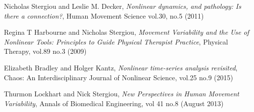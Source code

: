 \documentclass[10pt]{article}
\begin{document}
\begin{thebibliography}{10}
Nicholas Stergiou and Leslie M. Decker,
{\it Nonlinear dynamics, and pathology: Is there a connection?},
{Human Movement Science vol.30, no.5} (2011)

Regina T Harbourne and Nicholas Stergiou,
{\it Movement Variability and the Use of Nonlinear Tools: Principles to Guide
Physical Therapist Practice}, {Physical Therapy, vol.89 no.3}  (2009)

Elizabeth Bradley and Holger Kantz,
{\it Nonlinear time-series analysis revisited}, {Chaos: An Interdisciplinary
Journal of Nonlinear Science, vol.25 no.9}  (2015)


Thurmon Lockhart and Nick Stergiou,
{\it New Perspectives in Human Movement Variability},
{Annals of Biomedical Engineering, vol 41 no.8} (August 2013)


\end{thebibliography}
\end{document}
